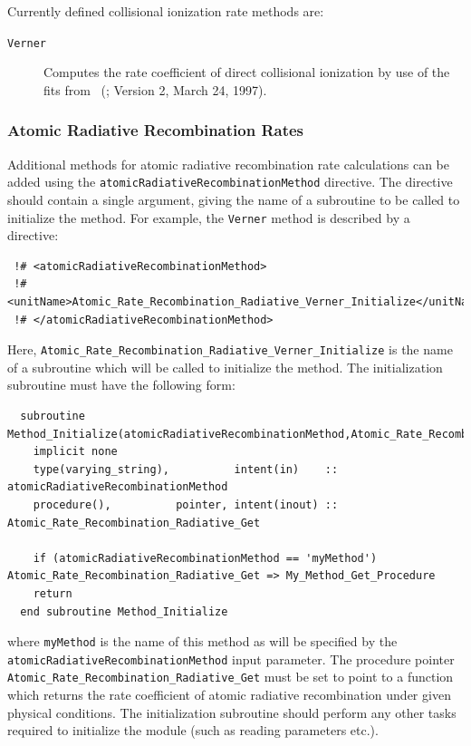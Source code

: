 Currently defined collisional ionization rate methods are:
\begin{description}
 \item [{\tt Verner}]  Computes the rate coefficient of direct collisional ionization by use of the fits from \citeauthor{voronov_practical_1997}~(\citeyear{voronov_practical_1997}; Version 2, March 24, 1997).
\end{description}

\subsubsection{Atomic Radiative Recombination Rates}

Additional methods for atomic radiative recombination rate calculations can be added using the {\tt atomicRadiativeRecombinationMethod} directive. The directive should contain a single argument, giving the name of a subroutine to be called to initialize the method. For example, the {\tt Verner} method is described by a directive:
\begin{verbatim}
 !# <atomicRadiativeRecombinationMethod>
 !#  <unitName>Atomic_Rate_Recombination_Radiative_Verner_Initialize</unitName>
 !# </atomicRadiativeRecombinationMethod>
\end{verbatim}
Here, {\tt Atomic\_Rate\_Recombination\_Radiative\_Verner\_Initialize} is the name of a subroutine which will be called to initialize the method. The initialization subroutine must have the following form:
\begin{verbatim}
  subroutine Method_Initialize(atomicRadiativeRecombinationMethod,Atomic_Rate_Recombination_Radiative_Get)
    implicit none
    type(varying_string),          intent(in)    :: atomicRadiativeRecombinationMethod
    procedure(),          pointer, intent(inout) :: Atomic_Rate_Recombination_Radiative_Get
    
    if (atomicRadiativeRecombinationMethod == 'myMethod') Atomic_Rate_Recombination_Radiative_Get => My_Method_Get_Procedure
    return
  end subroutine Method_Initialize
\end{verbatim}
where {\tt myMethod} is the name of this method as will be specified by the {\tt atomicRadiativeRecombinationMethod} input parameter. The procedure pointer {\tt Atomic\_Rate\_Recombination\_Radiative\_Get} must be set to point to a function which returns the rate coefficient of atomic radiative recombination under given physical conditions. The initialization subroutine should perform any other tasks required to initialize the module (such as reading parameters etc.).

